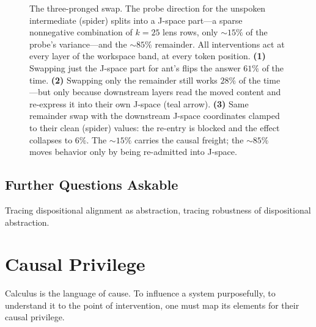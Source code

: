 \documentclass{article}
\begin{document}
\begin{figure}[htbp]
\caption{The three-pronged swap. The probe direction for the unspoken intermediate (spider) splits into a J-space part---a sparse nonnegative combination of $k{=}25$ lens rows, only ${\sim}15\%$ of the probe's variance---and the ${\sim}85\%$ remainder. All interventions act at every layer of the workspace band, at every token position. \textbf{(1)} Swapping just the J-space part for ant's flips the answer $61\%$ of the time. \textbf{(2)} Swapping only the remainder still works $28\%$ of the time---but only because downstream layers read the moved content and re-express it into their own J-space (teal arrow). \textbf{(3)} Same remainder swap with the downstream J-space coordinates clamped to their clean (spider) values: the re-entry is blocked and the effect collapses to $6\%$. The ${\sim}15\%$ carries the causal freight; the ${\sim}85\%$ moves behavior only by being re-admitted into J-space.}
\label{fig:three-prong}
\end{figure}




\subsection{Further Questions Askable}
Tracing dispositional alignment as abstraction, tracing robustness of dispositional abstraction.


\section{Causal Privilege}

Calculus is the language of cause. To influence a system purposefully, to understand it to the point of intervention, one must map its elements for their causal privilege.
\end{document}
